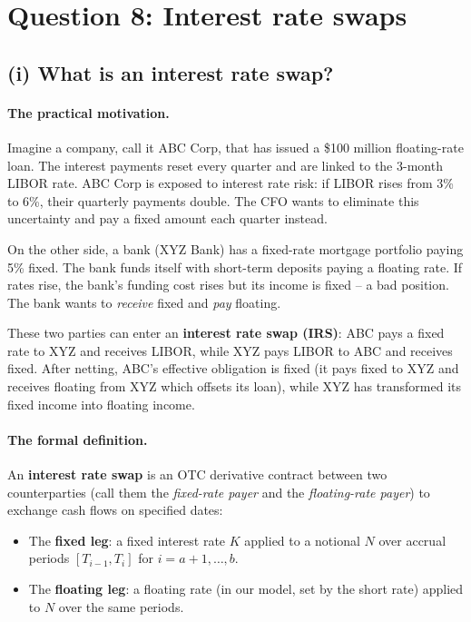 \documentclass[11pt]{article}
\begin{document}
\newpage
\section{Question 8: Interest rate swaps}

\subsection{(i) What is an interest rate swap?}

\paragraph{The practical motivation.}

Imagine a company, call it ABC Corp, that has issued a \$100 million
floating-rate loan.  The interest payments reset every quarter and are
linked to the 3-month LIBOR rate.  ABC Corp is exposed to interest rate
risk: if LIBOR rises from 3\% to 6\%, their quarterly payments double.
The CFO wants to eliminate this uncertainty and pay a fixed amount each
quarter instead.

On the other side, a bank (XYZ Bank) has a fixed-rate mortgage portfolio
paying 5\% fixed.  The bank funds itself with short-term deposits paying a
floating rate.  If rates rise, the bank's funding cost rises but its
income is fixed -- a bad position.  The bank wants to \emph{receive} fixed
and \emph{pay} floating.

These two parties can enter an \textbf{interest rate swap (IRS)}: ABC pays
a fixed rate to XYZ and receives LIBOR, while XYZ pays LIBOR to ABC and
receives fixed.  After netting, ABC's effective obligation is fixed
(it pays fixed to XYZ and receives floating from XYZ which offsets its
loan), while XYZ has transformed its fixed income into floating income.

\paragraph{The formal definition.}

An \textbf{interest rate swap} is an OTC derivative contract between two
counterparties (call them the \emph{fixed-rate payer} and the
\emph{floating-rate payer}) to exchange cash flows on specified dates:
\begin{itemize}
  \item The \textbf{fixed leg}: a fixed interest rate $K$ applied to a
  notional $N$ over accrual periods $[T_{i-1}, T_i]$ for
  $i = a+1, \ldots, b$.
  \item The \textbf{floating leg}: a floating rate (in our model, set by
  the short rate) applied to $N$ over the same periods.
\end{itemize}
\end{document}
